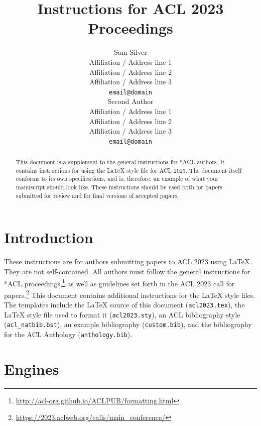 \documentclass[11pt]{article}
\title{Instructions for ACL 2023 Proceedings}
\author{Sam Silver \\
  Affiliation / Address line 1 \\
  Affiliation / Address line 2 \\
  Affiliation / Address line 3 \\
  \texttt{email@domain} \\\And
  Second Author \\
  Affiliation / Address line 1 \\
  Affiliation / Address line 2 \\
  Affiliation / Address line 3 \\
  \texttt{email@domain} \\}
\begin{document}
\maketitle
\begin{abstract}
This document is a supplement to the general instructions for *ACL authors. It contains instructions for using the \LaTeX{} style file for ACL 2023.
The document itself conforms to its own specifications, and is, therefore, an example of what your manuscript should look like.
These instructions should be used both for papers submitted for review and for final versions of accepted papers.
\end{abstract}

\section{Introduction}

These instructions are for authors submitting papers to ACL 2023 using \LaTeX. They are not self-contained. All authors must follow the general instructions for *ACL proceedings,\footnote{\url{http://acl-org.github.io/ACLPUB/formatting.html}} as well as guidelines set forth in the ACL 2023 call for papers.\footnote{\url{https://2023.aclweb.org/calls/main_conference/}} This document contains additional instructions for the \LaTeX{} style files.
The templates include the \LaTeX{} source of this document (\texttt{acl2023.tex}),
the \LaTeX{} style file used to format it (\texttt{acl2023.sty}),
an ACL bibliography style (\texttt{acl\_natbib.bst}),
an example bibliography (\texttt{custom.bib}),
and the bibliography for the ACL Anthology (\texttt{anthology.bib}).

\section{Engines}
\end{document}
